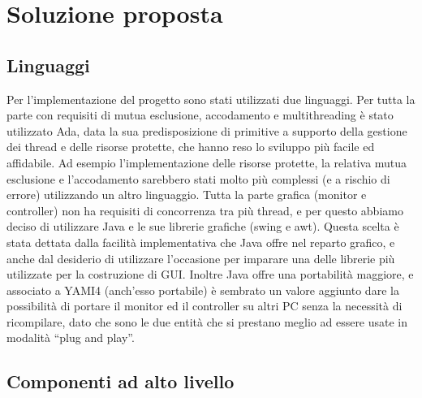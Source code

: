 
\chapter{Soluzione proposta} %

\label{Chapter6} %



\section{Linguaggi}

Per l’implementazione del progetto sono stati utilizzati due linguaggi. Per tutta la parte con requisiti di mutua esclusione, accodamento e multithreading è stato utilizzato Ada, data la sua predisposizione di primitive a supporto della gestione dei thread e delle risorse protette, che hanno reso lo sviluppo più facile ed affidabile. Ad esempio l’implementazione delle risorse protette, la relativa mutua esclusione e l’accodamento sarebbero stati molto più complessi (e a rischio di errore) utilizzando un altro linguaggio.
Tutta la parte grafica (monitor e controller) non ha requisiti di concorrenza tra più thread, e per questo abbiamo deciso di utilizzare Java e le sue librerie grafiche (swing e awt). Questa scelta è stata dettata dalla facilità implementativa che Java offre nel reparto grafico, e anche dal desiderio di utilizzare l’occasione per imparare una delle librerie più utilizzate per la costruzione di GUI. Inoltre Java offre una portabilità maggiore, e associato a YAMI4 (anch’esso portabile) è sembrato un valore aggiunto dare la possibilità di portare il monitor ed il controller su altri PC senza la necessità di ricompilare, dato che sono le due entità che si prestano meglio ad essere usate in modalità “plug and play”.
\newpage

\section{Componenti ad alto livello}

